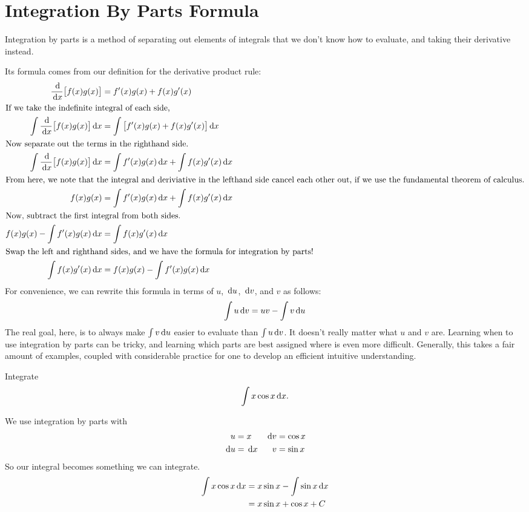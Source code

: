 \section{Integration By Parts Formula}

Integration by parts is a method of separating out elements of integrals that we don't know how to evaluate, and taking their derivative instead.

Its formula comes from our definition for the derivative product rule:
  \begin{align*}
    \frac{\,\mathrm{d}}{\,\mathrm{d} x}\big[ f(x) g(x) \big] &= f'(x)g(x)+f(x)g'(x) \\
    \intertext{If we take the indefinite integral of each side,}
    \int \frac{\,\mathrm{d}}{\,\mathrm{d} x}\big[ f(x) g(x) \big] \,\mathrm{d} x &= \int \big[f'(x)g(x)+f(x)g'(x)\big] \,\mathrm{d} x\\
    \intertext{Now separate out the terms in the righthand side.}
    \int \frac{\,\mathrm{d}}{\,\mathrm{d} x}\big[ f(x) g(x) \big] \,\mathrm{d} x &= \int f'(x)g(x)\,\mathrm{d} x +\int f(x)g'(x) \,\mathrm{d} x \\
    \intertext{From here, we note that the integral and deriviative in the lefthand side cancel each other out, if we use the fundamental theorem of calculus.}
    f(x)g(x) &= \int f'(x)g(x)\,\mathrm{d} x +\int f(x)g'(x) \,\mathrm{d} x \\
    \intertext{Now, subtract the first integral from both sides.}
    f(x)g(x) -\int f'(x)g(x) \,\mathrm{d} x &= \int f(x)g'(x) \,\mathrm{d} x \\
    \intertext{Swap the left and righthand sides, and we have the formula for integration by parts!}
     \int f(x)g'(x) \,\mathrm{d} x&=f(x)g(x) -\int f'(x)g(x) \,\mathrm{d} x \\
  \end{align*}
  For convenience, we can rewrite this formula in terms of $u$, $\,\mathrm{d} u$, $\,\mathrm{d} v$, and $v$ as follows:
\begin{equation}
  \int u \,\mathrm{d} v =  uv - \int v \,\mathrm{d} u
  \label{equation:intbyparts}
\end{equation}
The real goal, here, is to always make $\int v \,\mathrm{d} u$ easier to evaluate than $\int u \,\mathrm{d} v$.
It doesn't really matter what $u$ and $v$ are.
Learning when to use integration by parts can be tricky, and learning which parts are best assigned where is even more difficult.
Generally, this takes a fair amount of examples, coupled with considerable practice for one to develop an efficient intuitive understanding.
\begin{ex}
  Integrate
  \[
    \int x \cos x \,\mathrm{d} x.
    \]
    \begin{sol}
      We use integration by parts with
      \begin{align*}
        u&= x & \,\mathrm{d} v &= \cos x \\
        \,\mathrm{d} u &= \,\mathrm{d} x & v &= \sin x
      \end{align*}
      So our integral becomes something we can integrate.
      \begin{align*}
        \int x \cos x \,\mathrm{d} x &= x \sin x - \int \sin x \,\mathrm{d} x \\
        &= x \sin x + \cos x +C
      \end{align*}
    \end{sol}
\end{ex}
